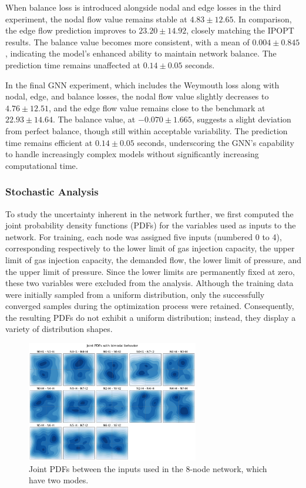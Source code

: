 When balance loss is introduced alongside nodal and edge losses in the third experiment, the nodal flow value remains stable at \( 4.83 \pm 12.65 \). In comparison, the edge flow prediction improves to \( 23.20 \pm 14.92 \), closely matching the IPOPT results. The balance value becomes more consistent, with a mean of \( 0.004 \pm 0.845 \), indicating the model's enhanced ability to maintain network balance. The prediction time remains unaffected at \( 0.14 \pm 0.05 \) seconds.

In the final GNN experiment, which includes the Weymouth loss along with nodal, edge, and balance losses, the nodal flow value slightly decreases to \( 4.76 \pm 12.51 \), and the edge flow value remains close to the benchmark at \( 22.93 \pm 14.64 \). The balance value, at \( -0.070 \pm 1.665 \), suggests a slight deviation from perfect balance, though still within acceptable variability. The prediction time remains efficient at \( 0.14 \pm 0.05 \) seconds, underscoring the GNN's capability to handle increasingly complex models without significantly increasing computational time.


\subsubsection{Stochastic Analysis}
To study the uncertainty inherent in the network further, we first computed the joint probability density functions (PDFs) for the variables used as inputs to the network. For training, each node was assigned five inputs (numbered 0 to 4), corresponding respectively to the lower limit of gas injection capacity, the upper limit of gas injection capacity, the demanded flow, the lower limit of pressure, and the upper limit of pressure. Since the lower limits are permanently fixed at zero, these two variables were excluded from the analysis. Although the training data were initially sampled from a uniform distribution, only the successfully converged samples during the optimization process were retained. Consequently, the resulting PDFs do not exhibit a uniform distribution; instead, they display a variety of distribution shapes.


\begin{figure}
    \begin{center}
        \includegraphics[width=0.67\textwidth]{figures/Chapter_NonLinealCensnet/PDF_inputs_inputs.png}
    \end{center}
    \caption{Joint PDFs between the inputs used in the 8-node network, which have two modes. }\label{fig:joint_distributions_input_input}
\end{figure}
     



